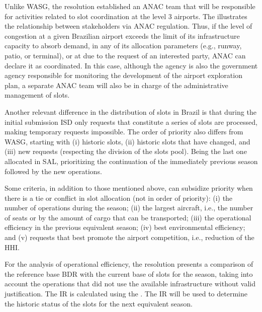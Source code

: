 Unlike \acrshort{WASG}, the resolution established an \acrshort{ANAC} team that will be responsible for activities related to slot coordination at the level 3 airports. The  illustrates the relationship between stakeholders via \acrshort{ANAC} regulation. Thus, if the level of congestion at a given Brazilian airport exceeds the limit of its infrastructure capacity to absorb demand, in any of its allocation parameters (e.g., runway, patio, or terminal), or at due to the request of an interested party, \acrshort{ANAC} can declare it as coordinated. In this case, although the agency is also the government agency responsible for monitoring the development of the airport exploration plan, a separate \acrshort{ANAC} team will also be in charge of the administrative management of slots.

%

Another relevant difference in the distribution of slots in Brazil is that during the initial submission \acrshort{ISD} only requests that constitute a series of slots are processed, making temporary requests impossible. The order of priority also differs from \acrshort{WASG}, starting with (i) historic slots, (ii) historic slots that have changed, and (iii) new requests (respecting the division of the slots pool). Being the last one allocated in \acrshort{SAL}, prioritizing the continuation of the immediately previous season followed by the new operations.

Some criteria, in addition to those mentioned above, can subsidize priority when there is a tie or conflict in slot allocation (not in order of priority): (i) the number of operations during the season; (ii) the largest aircraft, i.e., the number of seats or by the amount of cargo that can be transported; (iii) the operational efficiency in the previous equivalent season; (iv) best environmental efficiency; and (v) requests that best promote the airport competition, i.e., reduction of the \acrfull{HHI}.

For the analysis of operational efficiency, the resolution presents a comparison of the reference base \acrshort{BDR} with the current base of slots for the season, taking into account the operations that did not use the available infrastructure without valid justification. The \acrfull{IR} is calculated using the . The \acrshort{IR} will be used to determine the historic status of the slots for the next equivalent season. 

